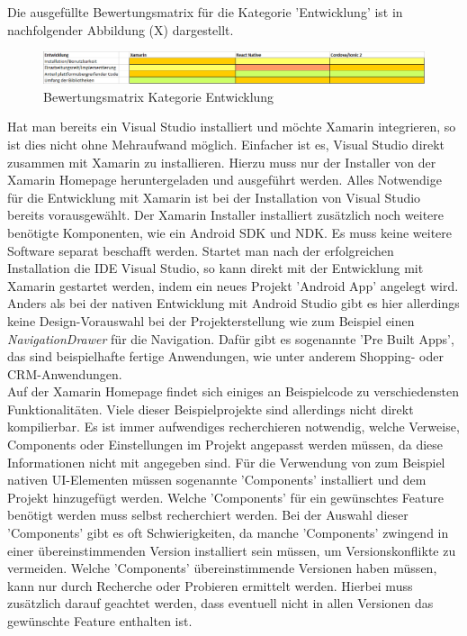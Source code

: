 Die ausgefüllte Bewertungsmatrix für die Kategorie 'Entwicklung' ist in nachfolgender Abbildung (X) dargestellt.

\begin{figure}[h]
	\centering
	\includegraphics[width=1\textwidth]{Bilder/Auswertung_Entwicklung.PNG}
	\caption{Bewertungsmatrix Kategorie Entwicklung}
	\label{fig:AuswEntw}
\end{figure}

Hat man bereits ein Visual Studio installiert und möchte Xamarin integrieren, so ist dies nicht ohne Mehraufwand möglich. Einfacher ist es, Visual Studio direkt zusammen mit Xamarin zu installieren. Hierzu muss nur der Installer von der Xamarin Homepage heruntergeladen und ausgeführt werden. Alles Notwendige für die Entwicklung mit Xamarin ist bei der Installation von Visual Studio bereits vorausgewählt. Der Xamarin Installer installiert zusätzlich noch weitere benötigte Komponenten, wie ein Android SDK und NDK. Es muss keine weitere Software separat beschafft werden. Startet man nach der erfolgreichen Installation die IDE Visual Studio, so kann direkt mit der Entwicklung mit Xamarin gestartet werden, indem ein neues Projekt 'Android App' angelegt wird. Anders als bei der nativen Entwicklung mit Android Studio gibt es hier allerdings keine Design-Vorauswahl bei der Projekterstellung wie zum Beispiel einen \textit{NavigationDrawer} für die Navigation. Dafür gibt es sogenannte 'Pre Built Apps', das sind beispielhafte fertige Anwendungen, wie unter anderem Shopping- oder CRM-Anwendungen. 
\\
Auf der Xamarin Homepage findet sich einiges an Beispielcode zu verschiedensten Funktionalitäten. Viele dieser Beispielprojekte sind allerdings nicht direkt kompilierbar. Es ist immer aufwendiges recherchieren notwendig, welche Verweise, Components oder Einstellungen im Projekt angepasst werden müssen, da diese Informationen nicht mit angegeben sind. Für die Verwendung von zum Beispiel nativen UI-Elementen müssen sogenannte 'Components' installiert und dem Projekt hinzugefügt werden. Welche 'Components' für ein gewünschtes Feature benötigt werden muss selbst recherchiert werden. Bei der Auswahl dieser 'Components' gibt es oft Schwierigkeiten, da manche 'Components' zwingend in einer übereinstimmenden Version installiert sein müssen, um Versionskonflikte zu vermeiden. Welche 'Components' übereinstimmende Versionen haben müssen, kann nur durch Recherche oder Probieren ermittelt werden. Hierbei muss zusätzlich darauf geachtet werden, dass eventuell nicht in allen Versionen das gewünschte Feature enthalten ist.
